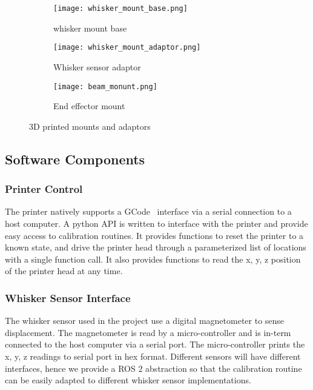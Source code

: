 \documentclass[runningheads]{llncs}
\begin{document}
\begin{figure}
    \begin{subfigure}{.32\textwidth}
    \centering
    \texttt{[image: whisker\_mount\_base.png]}
        \caption{whisker mount base}
        \label{fig:whisker_mount_base}
    \end{subfigure}
    \begin{subfigure}{.32\textwidth}
        \centering
        \texttt{[image: whisker\_mount\_adaptor.png]}
        \caption{Whisker sensor adaptor}
        \label{fig:whisker_mount_adaptor}
    \end{subfigure}
    \begin{subfigure}{.32\textwidth}
        \centering
        \texttt{[image: beam\_monunt.png]}
        \caption{End effector mount}
        \label{fig:beam_monunt}
    \end{subfigure}
    \caption{3D printed mounts and adaptors}
    \label{fig:calibration_rig}
\end{figure}

\subsection{Software Components}

\subsubsection{Printer Control}

The printer natively supports a GCode~\cite{kramerNISTRS274NGCInterpreter2000} interface via a serial connection to a host computer. A python API is written to interface with the printer and provide easy access to calibration routines. It provides functions to reset the printer to a known state, and drive the printer head through a parameterized list of locations with a single function call. It also provides functions to read the x, y, z position of the printer head at any time.

\subsubsection{Whisker Sensor Interface}

The whisker sensor used in the project use a digital magnetometer to sense displacement. The magnetometer is read by a micro-controller and is in-term connected to the host computer via a serial port. The micro-controller prints the x, y, z readings to serial port in hex format. Different sensors will have different interfaces, hence we provide a ROS 2 abstraction so that the calibration routine can be easily adapted to different whisker sensor implementations.
\end{document}
